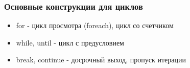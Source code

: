 \begin{frame}
\frametitle{Основные конструкции для циклов}
  \begin{itemize}
   \item for - цикл просмотра (foreach), цикл со счетчиком 
   \item while, until - цикл с предусловием  
   \item break, continue  - досрочный выход, пропуск итерации
  \end{itemize}
\end{frame}

